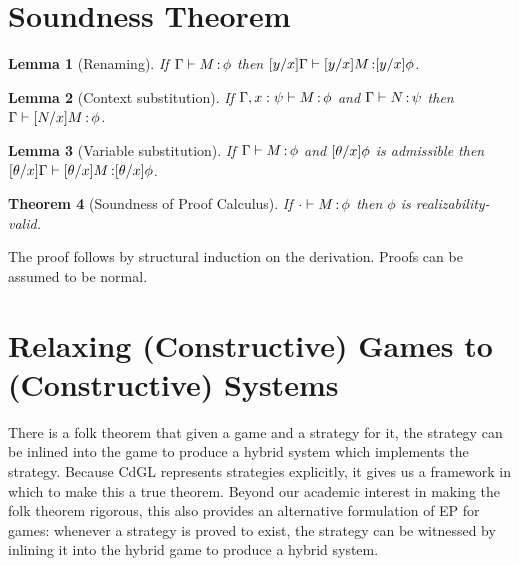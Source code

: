 \documentclass[12pt]{cmuthesis}
\newtheorem{theorem}{Theorem}
\newtheorem{lemma}[theorem]{Lemma}
\theoremstyle{definition}
\theoremstyle{remark}
\newcommand{\CdGL}{\textsf{CdGL}\xspace}
\begin{document}
\section{Soundness Theorem}
\begin{lemma}[Renaming]
  If $\proves{\G}{M}{\phi}$ then $\proves{\esub{\G}{x}{y}}{\esub{M}{x}{y}}{\esub{\phi}{x}{y}}$.
\end{lemma}
\begin{lemma}[Context substitution]
  If $\proves{\G,x:\psi}{M}{\phi}$ and $\proves{\G}{N}{\psi}$ then $\proves{\G}{\esub{M}{x}{N}}{\phi}$.
\end{lemma}
\begin{lemma}[Variable substitution]
  If $\proves{\G}{M}{\phi}$ and $\esub{\phi}{x}{\theta}$ is admissible then $\proves{\esub{\G}{x}{\theta}}{\esub{M}{x}{\theta}}{\esub{\phi}{x}{\theta}}$.
\end{lemma}
\begin{theorem}[Soundness of Proof Calculus]
  If $\proves{\cdot}{M}{\phi}$ then $\phi$ is realizability-valid.
\end{theorem}
The proof follows by structural induction on the derivation.
Proofs can be assumed to be normal.

\section{Relaxing (Constructive) Games to (Constructive) Systems}
There is a folk theorem that given a game and a strategy for it, the strategy can be inlined into the game to produce a hybrid system which implements the strategy.
Because \CdGL represents strategies explicitly, it gives us a framework in which to make this a true theorem.
Beyond our academic interest in making the folk theorem rigorous, this also provides an alternative formulation of EP for games: whenever a strategy is proved to exist, the strategy can be witnessed by inlining it into the hybrid game to produce a hybrid system.
\end{document}
